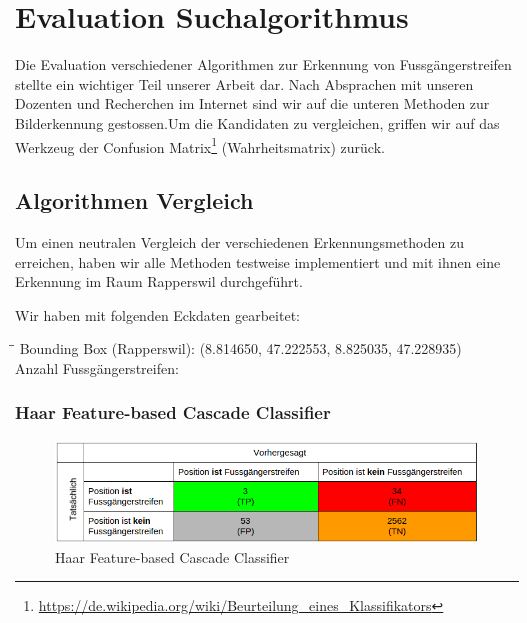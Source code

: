 \section{Evaluation Suchalgorithmus}
Die Evaluation verschiedener Algorithmen zur Erkennung von Fussgängerstreifen stellte ein wichtiger Teil unserer Arbeit dar. Nach Absprachen mit unseren Dozenten und Recherchen im Internet sind wir auf die unteren Methoden zur Bilderkennung gestossen.Um die Kandidaten zu vergleichen, griffen wir auf das Werkzeug der Confusion Matrix\footnote{\url{https://de.wikipedia.org/wiki/Beurteilung_eines_Klassifikators}} (Wahrheitsmatrix) zurück.

\subsection{Algorithmen Vergleich}
Um einen neutralen Vergleich der verschiedenen Erkennungsmethoden zu erreichen, haben wir alle Methoden testweise implementiert und mit ihnen eine Erkennung im Raum Rapperswil durchgeführt.

Wir haben mit folgenden Eckdaten gearbeitet:
\begin{tabbing}[H]
    \hspace*{5cm}\=\hspace*{6cm}\= \kill
    Bounding Box (Rapperswil): \> (8.814650, 47.222553, 8.825035, 47.228935) \\
    Anzahl Fussgängerstreifen:  \\
\end{tabbing}


\subsubsection{Haar Feature-based Cascade Classifier}
\begin{figure}[H]
\includegraphics[width=\textwidth]{images/haar_conf.png}
\caption[Haar Feature-based Cascade Classifier]{Haar Feature-based Cascade Classifier}
\end{figure}
